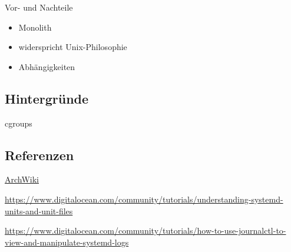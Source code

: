 \begin{frame}{Vor- und Nachteile}
\begin{itemize}
\item Monolith
\item widerspricht Unix-Philosophie
\item Abhängigkeiten
\end{itemize}
\end{frame}

\subsection{Hintergründe}

\begin{frame}
cgroups
\end{frame}

\subsection{Referenzen}

\begin{frame}
\href{https://wiki.archlinux.org/index.php/systemd}{ArchWiki}

\href{https://www.digitalocean.com/community/tutorials/understanding-systemd-units-and-unit-files}{https://www.digitalocean.com/community/tutorials/understanding-systemd-units-and-unit-files}

\href{https://www.digitalocean.com/community/tutorials/how-to-use-journalctl-to-view-and-manipulate-systemd-logs}{https://www.digitalocean.com/community/tutorials/how-to-use-journalctl-to-view-and-manipulate-systemd-logs}
\end{frame}



